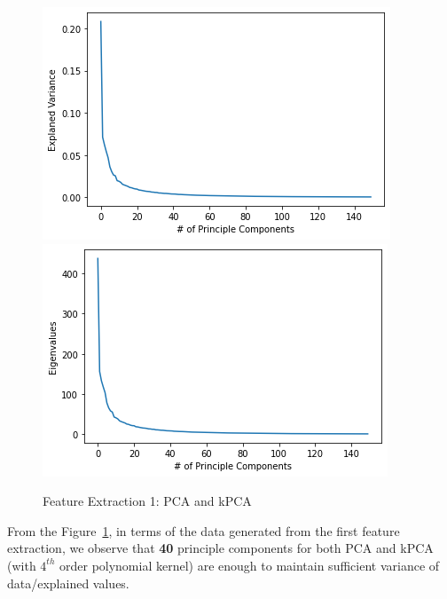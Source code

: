 \documentclass{article}
\begin{document}
\begin{figure}[!htb]
  \includegraphics[width=\linewidth]{figure/pca_none.png}
\endminipage\hfill
{}
  \includegraphics[width=\linewidth]{figure/kpca_none.png}
\endminipage
\caption{Feature Extraction 1: PCA and kPCA}
\label{feature1}
\end{figure}


From the Figure~\ref{feature1}, in terms of the data generated from the first feature extraction, we observe that \textbf{40} principle components for both PCA and kPCA (with $4^{th}$ order polynomial kernel) are enough to maintain sufficient variance of data/explained values.
\end{document}
